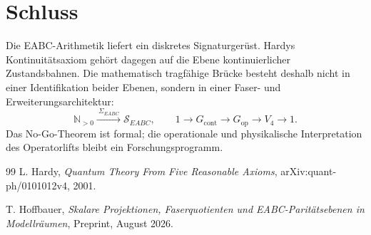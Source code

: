 \documentclass[11pt,a4paper,reqno]{amsart}
\theoremstyle{definition}
\theoremstyle{remark}
\newcommand{\N}{\mathbb{N}}
\newcommand{\SEABC}{\mathcal{S}_{EABC}}
\begin{document}
\section{Schluss}

Die EABC-Arithmetik liefert ein diskretes Signaturgerüst. Hardys Kontinuitätsaxiom gehört dagegen auf die Ebene kontinuierlicher Zustandsbahnen. Die mathematisch tragfähige Brücke besteht deshalb nicht in einer Identifikation beider Ebenen, sondern in einer Faser- und Erweiterungsarchitektur:
\begin{equation}
\N_{>0}
\xrightarrow{\ \Sigma_{EABC}\ }
\SEABC,
\qquad
1\longrightarrow G_{\mathrm{cont}}
\longrightarrow G_{\mathrm{op}}
\longrightarrow V_4
\longrightarrow1.
\end{equation}
Das No-Go-Theorem ist formal; die operationale und physikalische Interpretation des Operatorlifts bleibt ein Forschungsprogramm.

\begin{thebibliography}{99}
L. Hardy,
\emph{Quantum Theory From Five Reasonable Axioms},
arXiv:quant-ph/0101012v4, 2001.

T. Hoffbauer,
\emph{Skalare Projektionen, Faserquotienten und EABC-Paritätsebenen in Modellräumen},
Preprint, August 2026.
\end{thebibliography}
\end{document}
